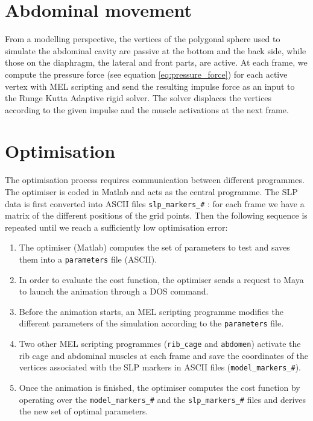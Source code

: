 \section{Abdominal movement}
From a modelling perspective, the vertices of the polygonal sphere used to simulate the abdominal cavity are passive at the bottom and the back side, while those on the diaphragm, the lateral and front parts, are active. At each frame, we compute the pressure force (see equation \ref{eq:pressure_force}) for each active vertex with MEL scripting and send the resulting impulse force as an input to the Runge Kutta Adaptive rigid solver. The solver displaces the vertices according to the given impulse and the muscle activations at the next frame. 

\section{Optimisation}
The optimisation process requires communication between different programmes. The optimiser is coded in Matlab and acts as the central programme. The SLP data is first converted into ASCII files \texttt{slp\_markers\_\#} : for each frame we have a matrix of the different positions of the grid points. Then the following sequence is repeated until we reach a sufficiently low optimisation error:

\begin{enumerate}
\item The optimiser (Matlab) computes the set of parameters to test and saves them into a \texttt{parameters} file (ASCII).
\item In order to evaluate the cost function, the optimiser sends a request to Maya to launch the animation through a DOS command.
\item Before the animation starts, an MEL scripting programme modifies the different parameters of the simulation according to the \texttt{parameters} file.
\item Two other MEL scripting programmes (\texttt{rib\_cage} and \texttt{abdomen}) activate the rib cage and abdominal muscles at each frame and save the coordinates of the vertices associated with the SLP markers in ASCII files (\texttt{model\_markers\_\#}).
\item Once the animation is finished, the optimiser computes the cost function by operating over the \texttt{model\_markers\_\#} and the \texttt{slp\_markers\_\#} files and derives the new set of optimal parameters.
\end{enumerate}

